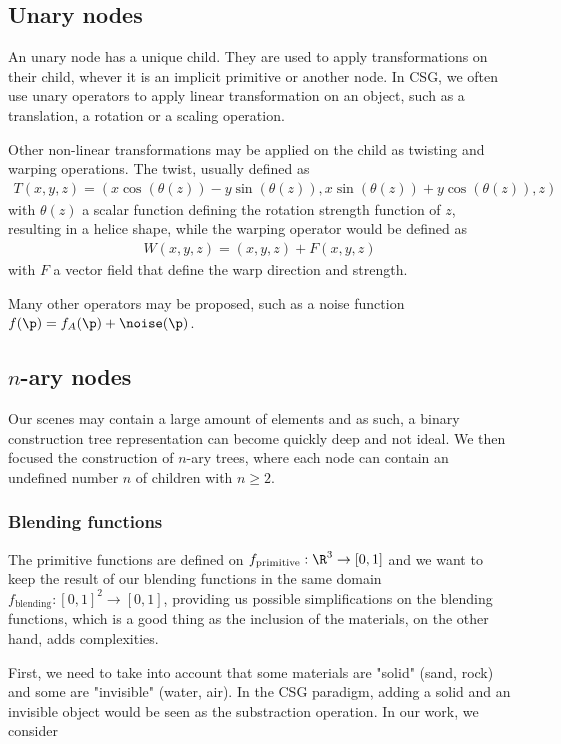 \subsection{Unary nodes}
An unary node has a unique child. They are used to apply transformations on their child, whever it is an implicit primitive or another node. In CSG, we often use unary operators to apply linear transformation on an object, such as a translation, a rotation or a scaling operation. 

Other non-linear transformations may be applied on the child as twisting and warping operations. The twist, usually defined as 
\begin{align}
    T(x, y, z) = \left( x \cos(\theta(z)) - y \sin(\theta(z)), x \sin(\theta(z)) + y \cos(\theta(z)), z \right)
\end{align}
with $\theta(z)$ a scalar function defining the rotation strength function of $z$, resulting in a helice shape, while the warping operator would be defined as 
\begin{align}
    W(x,y,z) = (x,y,z) + F(x, y, z)
\end{align}
with $F$ a vector field that define the warp direction and strength.
    

Many other operators may be proposed, such as a noise function $f(\p) = f_A(\p) + \noise(\p)$.

\subsection{$n$-ary nodes}
Our scenes may contain a large amount of elements and as such, a binary construction tree representation can become quickly deep and not ideal. We then focused the construction of $n$-ary trees, where each node can contain an undefined number $n$ of children with $n \geq 2$.

\subsubsection{Blending functions}
The primitive functions are defined on $f_{\text{primitive}}: \R^3 \to [0,1]$ and we want to keep the result of our blending functions in the same domain $f_{\text{blending}}: [0,1]^2 \to [0,1]$, providing us possible simplifications on the blending functions, which is a good thing as the inclusion of the materials, on the other hand, adds complexities.

First, we need to take into account that some materials are "solid" (sand, rock) and some are "invisible" (water, air). In the CSG paradigm, adding a solid and an invisible object would be seen as the substraction operation. In our work, we consider

